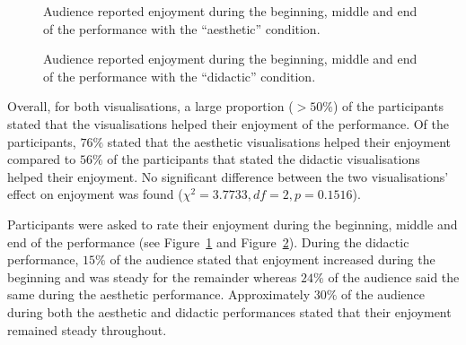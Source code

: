 \documentclass{sig-alternate}
\begin{document}
\begin{figure}
\centering
{}
\caption{Audience reported enjoyment during the beginning, middle and end of the performance with the ``aesthetic'' condition.}
\label{fig:aesthetic-enjoyment}
\end{figure}

\begin{figure}
\centering
{}
\caption{Audience reported enjoyment during the beginning, middle and end of the performance with the ``didactic'' condition.}
\label{fig:didactic-enjoyment}
\end{figure}

Overall, for both visualisations, a large proportion ($> 50\%$) of the participants stated that the visualisations helped their enjoyment of the performance. Of the participants, $76\%$ stated that the aesthetic visualisations helped their enjoyment compared to $56\%$ of the participants that stated the didactic visualisations helped their enjoyment. No significant difference between the two visualisations' effect on enjoyment was found ($\chi^2=3.7733,df=2,p=0.1516$).

Participants were asked to rate their enjoyment during the beginning, middle and end of the performance (see Figure~\ref{fig:aesthetic-enjoyment} and Figure~\ref{fig:didactic-enjoyment}). During the didactic performance, $15\%$ of the audience stated that enjoyment increased during the beginning and was steady for the remainder whereas $24\%$ of the audience said the same during the aesthetic performance. Approximately $30\%$ of the audience during both the aesthetic and didactic performances stated that their enjoyment remained steady throughout.



\end{document}

